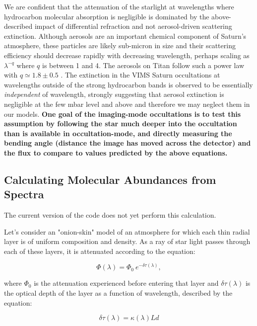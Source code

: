 \documentclass[12pt]{article}
\begin{document}
We are confident that the attenuation of the starlight at wavelengths where
hydrocarbon molecular absorption is negligible is dominated by the
above-described impact of differential refraction and not aerosol-driven
scattering extinction. Although aerosols are an important chemical component of
Saturn's atmosphere, these particles are likely sub-micron in size and their
scattering efficiency should decrease rapidly with decreasing wavelength,
perhaps scaling as $\lambda^{-q}$ where $q$ is between 1 and 4. The aerosols on
Titan follow such a power law with $q\simeq1.8\pm0.5$ \citep{Bellucci09}. The
extinction in the VIMS Saturn occultations at wavelengths outside of the strong
hydrocarbon bands is observed to be essentially {\sl independent} of
wavelength, strongly suggesting that aerosol extinction is negligible at the
few mbar level and above and therefore we may neglect them in our models. {\bf
One goal of the imaging-mode occultations is to test this assumption by
following the star much deeper into the occultation than is available in
occultation-mode, and directly measuring the bending angle (distance the image
has moved across the detector) and the flux to compare to values predicted by
the above equations.}

\subsection{Calculating Molecular Abundances from Spectra}

The current version of the code does not yet perform this calculation.

Let's consider an "onion-skin" model of an atmosphere for which each thin
radial layer is of uniform composition and density. As a ray of star light
passes through each of these layers, it is attenuated according to the
equation:

\begin{equation}
\Phi(\lambda) = \Phi_0\ e^{-\delta\tau(\lambda)},
\label{eq:abs_flux}
\end{equation}

\noindent where $\Phi_0$ is the attenuation experienced before entering that layer
and $\delta\tau(\lambda)$ is the optical depth of the layer as a function of
wavelength, described by the equation:

\begin{equation}
\delta\tau(\lambda) = \kappa(\lambda) L d
\label{eq:optical_depth}
\end{equation}
\end{document}
